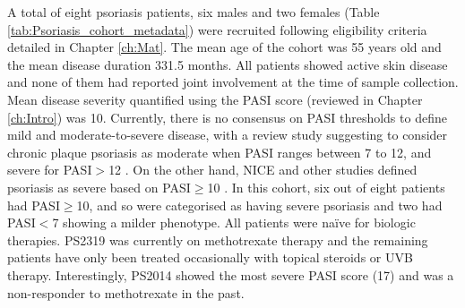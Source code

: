 A total of eight psoriasis patients, six males and two females (Table \ref{tab:Psoriasis_cohort_metadata}) were recruited following eligibility criteria detailed in Chapter \ref{ch:Mat}. The mean age of the cohort was 55 years old and the mean disease duration 331.5 months. All patients showed active skin disease and none of them had reported joint involvement at the time of sample collection. Mean disease severity quantified using the PASI score (reviewed in Chapter \ref{ch:Intro}) was 10. Currently, there is no consensus on PASI thresholds to define mild and moderate-to-severe disease, with a review study suggesting to consider chronic plaque psoriasis as moderate when PASI ranges between 7 to 12, and severe for PASI$>$12 \parencite{Schmitt2005}. On the other hand, NICE and other studies defined psoriasis as severe based on PASI$\geq$10 \parencite{Woolacott2006, Finlay2005}. In this cohort, six out of eight patients had PASI$\geq$10, and so were categorised as having severe psoriasis and two had PASI$<$7 showing a milder phenotype. All patients were na\"{i}ve for biologic therapies. PS2319 was currently on methotrexate therapy and the remaining patients have only been treated occasionally with topical steroids or UVB therapy. Interestingly, PS2014 showed the most severe PASI score (17) and was a non-responder to methotrexate in the past. 

